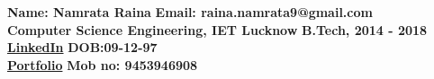 \documentclass{resume}
\begin{document}

{\bf Name: Namrata Raina} \hfill {\bf Email: raina.namrata9@gmail.com}\\
{\bf Computer Science Engineering, IET Lucknow} \hfill {\bf B.Tech,
	2014 - 2018}\\
{\bf \href{https://www.linkedin.com/in/namrataraina17/}{LinkedIn}} \hfill {\bf DOB:09-12-97}\\
{\bf \href{https://drive.google.com/drive/folders/16wEqnK6MY3OGnAZvjYez2oKZkuY4y3rt?usp=share_link}{Portfolio}} \hfill {\bf Mob no: 9453946908}\\

\vspace{-.4cm}
\end{document}
